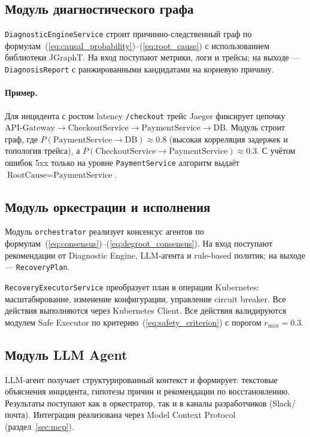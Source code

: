\subsection{Модуль диагностического графа}

\texttt{DiagnosticEngineService} строит причинно-следственный граф по формулам~(\ref{eq:causal_probability})--(\ref{eq:root_cause}) с использованием библиотеки JGraphT. На вход поступают метрики, логи и трейсы; на выходе --- \texttt{DiagnosisReport} с ранжированными кандидатами на корневую причину.

\paragraph{Пример.}
Для инцидента с ростом latency \texttt{/checkout} трейс Jaeger фиксирует цепочку
$\text{API-Gateway} \rightarrow \text{CheckoutService} \rightarrow \text{PaymentService} \rightarrow \text{DB}$.
Модуль строит граф, где $P(\text{PaymentService} \to \text{DB}) \approx 0.8$ (высокая корреляция задержек и топология трейса), а $P(\text{CheckoutService} \to \text{PaymentService}) \approx 0.3$. С учётом ошибок 5xx только на уровне \texttt{PaymentService} алгоритм выдаёт $\text{RootCause} = \text{PaymentService}$.

\subsection{Модуль оркестрации и исполнения}

Модуль \texttt{orchestrator} реализует консенсус агентов по формулам~(\ref{eq:consensus})--(\ref{eq:degroot_consensus}). На вход поступают рекомендации от Diagnostic Engine, LLM-агента и rule-based политик; на выходе --- \texttt{RecoveryPlan}.

\texttt{RecoveryExecutorService} преобразует план в операции Kubernetes: масштабирование, изменение конфигурации, управление circuit breaker. Все действия выполняются через Kubernetes Client. Все действия валидируются модулем Safe Executor по критерию~(\ref{eq:safety_criterion}) с порогом $r_{\max} = 0.3$.

\subsection{Модуль LLM Agent}

LLM-агент получает структурированный контекст и формирует: текстовые объяснения инцидента, гипотезы причин и рекомендации по восстановлению. Результаты поступают как в оркестратор, так и в каналы разработчиков (Slack/почта). Интеграция реализована через Model Context Protocol (раздел~\ref{sec:mcp}).

